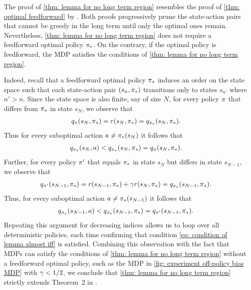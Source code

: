 \begin{remark}
The proof of \autoref{thm: lemma for no long term region} resembles the proof of \autoref{thm: optimal feedforward} by \citet{Wang2022OnLearning}. Both proofs progressively prune the state-action pairs that cannot be greedy in the long term until only the optimal ones remain.
Nevertheless, \autoref{thm: lemma for no long term region} does not require a feedforward optimal policy ${\pi}_*$.
On the contrary, if the optimal policy is feedforward, the MDP satisfies the conditions of \autoref{thm: lemma for no long term region}. 

Indeed, recall that a feedforward optimal policy ${\pi}_*$ induces an order on the state space such that each state-action pair $(s_n, {\pi}_*)$ transitions only to states $s_{n'}$ where $n' > n$.
Since the state space is also finite, say of size $N$, for every policy $\pi$ that differs from ${\pi}_*$ in state $s_N$, we observe that
\begin{align*}
    q_{\pi}(s_N, {\pi}_*) 
    = r(s_N, {\pi}_*)
    = q_{{\pi}_*}(s_N, {\pi}_*) .
\end{align*}
Thus for every suboptimal action $a \neq {\pi}_*(s_N)$ it follows that
\begin{align*}
    q_{{\pi}_*}(s_N, a) < q_{{\pi}_*}(s_N, {\pi}_*) = q_{\pi}(s_N, {\pi}_*)  .
\end{align*}
Further, for every policy $\pi'$ that equals ${\pi}_*$ in state $s_N$ but differs in state $s_{N-1}$, we observe that
\begin{align*}
    q_{\pi'}(s_{N-1}, {\pi}_*) 
    = r(s_{N-1}, {\pi}_*) + \gamma r(s_{N}, {\pi}_*)
    = q_{{\pi}_*}(s_{N-1}, {\pi}_*) .
\end{align*}
Thus, for every suboptimal action $a \neq {\pi}_*(s_{N-1})$ it follows that
\begin{align*}
    q_{{\pi}_*}(s_{N-1}, a) < q_{{\pi}_*}(s_{N-1}, {\pi}_*) = q_{\pi'}(s_{N-1}, {\pi}_*) .
\end{align*}
Repeating this argument for decreasing indices allows us to loop over all deterministic policies, each time confirming that condition \eqref{eq: condition of lemma almost iff} is satisfied.
Combining this observation with the fact that MDPs can satisfy the conditions of \autoref{thm: lemma for no long term region} without a feedforward optimal policy, such as the MDP in \autoref{fig: experiment off-policy bias MDP} with $\gamma<1/2$,
we conclude that \autoref{thm: lemma for no long term region} strictly extends Theorem~2 in \citep{Wang2022OnLearning}.
\end{remark}